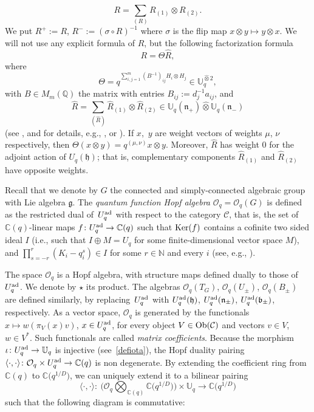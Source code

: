 \documentclass[10pt,a4paper]{amsart}
\numberwithin{equation}{section}
\theoremstyle{definition}
\newcommand{\Oq}{\Oo_{q}}
\newcommand{\mUq}{\mathbb{U}_q}
\newcommand{\mc}{\mathbb{C}}
\newcommand{\Oo}{{\mathcal O}}
\newcommand{\ra}{\rightarrow}
\begin{document}
\begin{equation}\label{Rcat}
R=\sum_{(R)}R_{(1)}\otimes R_{(2)}.
\end{equation}
We put $R^+:=R$, $R^- := (\sigma\circ R)^{-1}$ where $\sigma$ is the flip map $x\otimes y \mapsto y\otimes x$. We will not use any explicit formula of $R$, but the following factorization formula
\begin{equation}\label{Rmatfact}
R=\Theta \hat{R},
\end{equation}
where
\[\Theta = q^{\sum_{i,j=1}^m (B^{-1})_{ij} H_i\otimes H_j} \in \mUq^{\hat{\otimes} 2},\]
with $B\in M_m(\mathbb{Q})$ the matrix with entries $B_{ij}:=d_j^{-1}a_{ij}$, and
\[\hat{R}=\sum_{(\hat{R})} \hat{R}_{(1)} \otimes \hat{R}_{(2)}\in \mUq(\mathfrak{n}_+)\hat{\otimes} \mUq(\mathfrak{n}_-)\]
(see \cite[Section 3.2]{BR}, and for details, e.g., \cite[Theorem 8.3.9]{CP}, or \cite[Theorem 3.108]{VY}). If $x$,~$y$ are weight vectors of weights $\mu$, $\nu$ respectively, then $\Theta(x\otimes y) = q^{(\mu,\nu)} x\otimes y$. Moreover, $\hat{R}$ has weight $0$ for the adjoint action of $U_q(\mathfrak{h})$; that is, complementary components $\hat{R}_{(1)}$ and $\hat{R}_{(2)}$ have opposite weights.


Recall that we denote by $G$ the connected and simply-connected algebraic group with Lie algebra $\mathfrak{g}$. The {\it quantum function Hopf algebra} $\Oo_q=\Oo_q(G)$ is defined as the restricted dual of~$U_q^{\rm ad}$ with respect to the category $\mathcal{C}$, that is, the set of ${\mathbb C}(q)$-linear maps $f\colon U_q^{\rm ad}\ra \mc(q)$ such that ${\rm Ker}(f)$ contains a cofinite two sided ideal $I$ (i.e., such that $I\oplus M =U_q$ for some finite-dimensional vector space $M$), and $ \prod_{s=-r}^r (K_i - q_i^s) \in I$ for some $r\in \mathbb{N}$ and every $i$ (see, e.g., \cite[Chapter I.7]{BG}).

The space $\Oo_q$ is a Hopf algebra, with structure maps defined dually to those of $U_q^{\rm ad}$. We denote by $\star$ its product. The algebras $\Oo_q(T_G)$, $\Oo_q(U_\pm)$, $\Oo_q(B_\pm)$ are defined similarly, by replacing~$U_q^{\rm ad}$ with $U_q^{\rm ad}(\mathfrak{h})$, $U_q^{\rm ad}(\mathfrak{n}_\pm)$, $U_q^{\rm ad}(\mathfrak{b}_\pm)$, respectively. As a vector space, $\Oq$ is generated by the functionals $x\mapsto w(\pi_V(x)v)$, $x\in U_q^{\rm ad}$, for every object $V\in {\rm Ob}(\mathcal{C})$ and vectors $v\in V$, $w\in V^*$. Such functionals are called {\it matrix coefficients}. Because the morphism $\iota\colon U_q^{\rm ad}\to \mathbb{U}_q$ is injective (see~\eqref{defiota}), the Hopf duality pairing $\langle\cdot,\cdot\rangle \colon \Oq \times U_q^{\rm ad} \ra \mc(q)$ is non degenerate. By extending the coefficient ring from $\mc(q)$ to $\mc\big(q^{1/D}\big)$, we can uniquely extend it to a bilinear pairing
\[\langle\cdot,\cdot\rangle\colon\ \big(\Oq \bigotimes_{{\mathbb C}(q)} {\mathbb C}\big(q^{1/D}\big)\big)\times \mUq \ra \mc\big(q^{1/D}\big)\]
such that the following diagram is commutative:
\end{document}
